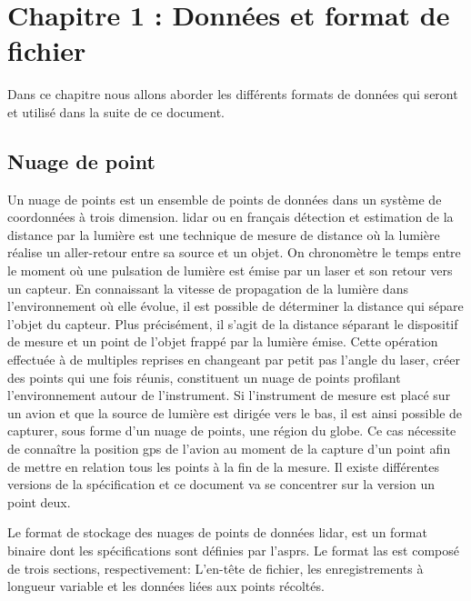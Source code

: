 \chapter{Chapitre 1 : Données et format de fichier}


Dans ce chapitre nous allons aborder les différents formats de données qui seront
et utilisé dans la suite de ce document.

\section{Nuage de point}
Un nuage de points est un ensemble de points de données dans un système de
coordonnées à trois dimension.
\gls{lidar} ou en français 
détection et estimation de la distance par la lumière est une technique de mesure de distance où la lumière réalise un 
aller-retour entre sa source et un objet. On chronomètre le temps entre le moment 
où une pulsation de lumière est émise par un laser et son retour vers un capteur.
En connaissant la vitesse de propagation de la lumière dans l’environnement où elle
évolue, il est possible de déterminer la distance qui sépare l’objet 
du capteur. Plus précisément, il s’agit de la distance séparant le dispositif de
mesure et un point de l’objet frappé par la lumière émise. 
Cette opération effectuée à de multiples reprises en changeant par petit pas 
l’angle du laser, créer des points qui une fois réunis,
constituent un nuage de points profilant l'environnement autour de l'instrument.
Si l'instrument de mesure est placé sur un avion et que la source de lumière est
dirigée vers le bas, il est ainsi possible de capturer, sous forme d'un nuage de
points, une région du globe. Ce cas nécessite de connaître la position
\gls{gps} de l'avion au moment de la capture d'un point afin de mettre en relation
tous les points à la fin de la mesure.
Il existe différentes versions de la spécification et ce document va se concentrer sur la version un point deux.

Le format de stockage des nuages de points de données \gls{lidar}, est un format
binaire dont les spécifications sont définies par l'\gls{asprs}.
Le format \gls{las} est composé de trois sections, respectivement:
L'en-tête de fichier, les enregistrements à longueur variable et les données liées aux points récoltés.

